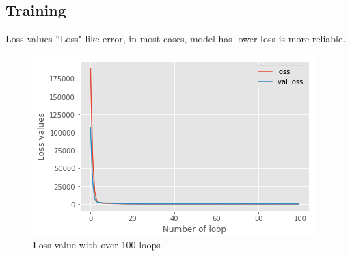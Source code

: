\documentclass[xcolor=table, 11pt]{beamer}
\begin{document}
\subsection{Training}
\begin{frame}{Loss values}
``Loss" like error, in most cases, model has lower loss is more reliable.
    \begin{figure}
        \centering
        \includegraphics[scale=0.65]{fig/loss.png}
        \caption{Loss value with over 100 loops}
        \label{fig:loss}
    \end{figure}
\end{frame}
\end{document}
